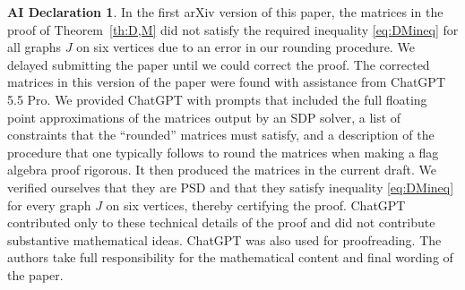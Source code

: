 \documentclass[12pt]{article}
\numberwithin{equation}{section}
\theoremstyle{definition}
\newtheorem*{ai}{AI Declaration}
\theoremstyle{remark}
\begin{document}
\begin{ai}
In the first arXiv version of this paper, the matrices in the proof of Theorem~\ref{th:D,M} did not satisfy the required inequality \eqref{eq:DMineq} for all graphs $J$ on six vertices due to an error in our rounding procedure. We delayed submitting the paper until we could correct the proof. The corrected matrices in this version of the paper were found with assistance from ChatGPT 5.5 Pro. We provided ChatGPT with prompts that included the full floating point approximations of the matrices output by an SDP solver, a list of constraints that the ``rounded'' matrices must satisfy, and a description of the procedure that one typically follows to round the matrices when making a flag algebra proof rigorous. It then produced the matrices in the current draft. We verified ourselves that they are PSD and that they satisfy inequality \eqref{eq:DMineq} for every graph $J$ on six vertices, thereby certifying the proof. ChatGPT contributed only to these technical details of the proof and did not contribute substantive mathematical ideas. ChatGPT was also used for proofreading. The authors take full responsibility for the mathematical content and final wording of the paper.
\end{ai}



\end{document}
